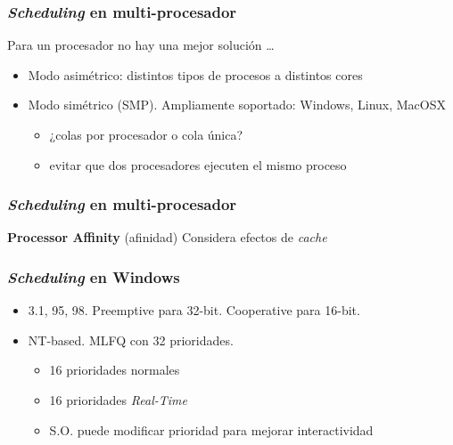 \documentclass[letter]{beamer}
\begin{document}
\begin{frame}
  \frametitle{{\em Scheduling} en multi-procesador}

  Para un procesador no hay una mejor solución \ldots 
  
  \begin{itemize}
    \item<3-> Modo asimétrico: distintos tipos de procesos a distintos cores
    \item<4-> Modo simétrico (SMP). Ampliamente soportado: Windows, Linux, MacOSX
      \begin{itemize}
        \item ¿colas por procesador o cola única?
        \item evitar que dos procesadores ejecuten el mismo proceso
      \end{itemize}
  \end{itemize}
    

\end{frame}
\begin{frame}
  \frametitle{{\em Scheduling} en multi-procesador}

  \begin{block}{{\bf Processor Affinity} (afinidad)}
  Considera efectos de {\em cache}

  
  \end{block}

  
\end{frame}

\begin{frame}
  \frametitle{{\em Scheduling} en Windows}

  \begin{itemize}
    \item 3.1, 95, 98. Preemptive para 32-bit. Cooperative para 16-bit.
    \item NT-based. MLFQ con 32 prioridades.
      \begin{itemize}
        \item 16 prioridades normales
        \item 16 prioridades {\em Real-Time}
        \item S.O. puede modificar prioridad para mejorar interactividad
      \end{itemize}
  \end{itemize}
\end{frame}
\end{document}
